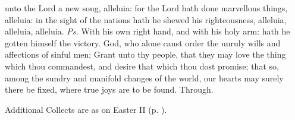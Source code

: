 \introit
{} unto the Lord a new song, alleluia: for the Lord hath done marvellous things, alleluia: in the sight of the nations hath he shewed his righteousness, alleluia, alleluia, alleluia. \textit{Ps.} With his own right hand, and with his holy arm: hath he gotten himself the victory.
\collect
{} God, who alone canst order the unruly wills and affections of sinful men; Grant unto thy people, that they may love the thing which thou commandest, and desire that which thou dost promise; that so, among the sundry and manifold changes of the world, our hearts may surely there be fixed, where true joys are to be found. Through.
\begin{rubric}
    Additional Collects are as on Easter II (p. \pageref{EasterII}).
\end{rubric}

